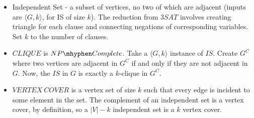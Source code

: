 \begin{itemize}
	\item Independent Set - a subset of vertices, no two of which are adjacent (inputs are $\langle G,k\rangle$, for IS of size $k$).  The reduction from $3SAT$ involves creating triangle for each clause and connecting negations of corresponding variables.  Set $k$ to the number of clauses.
	
	\item $CLIQUE$ is $NP\mhyphen Complete$.  Take a $\langle G,k\rangle$ instance of $IS$.  Create $G^C$ where two vertices are adjacent in $G^C$ if and only if they are not adjacent in $G$.  Now, the $IS$ in $G$ is exactly a $k$-clique in $G^C$.
	
	\item $VERTEX\ COVER$ is a vertex set of size $k$ such that every edge is incident to some element in the set.  The complement of an independent set is a vertex cover, by definition, so a $|V|-k$ independent set is a $k$ vertex cover.
	
	
	
\end{itemize}




